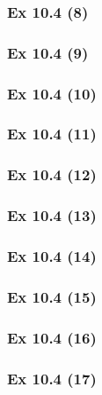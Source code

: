 \subsubsection{Ex 10.4 (8)}\label{sec:Ex_10.4.8}

\subsubsection{Ex 10.4 (9)}\label{sec:Ex_10.4.9}

\subsubsection{Ex 10.4 (10)}\label{sec:Ex_10.4.10}

\newpage		%

\subsubsection{Ex 10.4 (11)}\label{sec:Ex_10.4.11}

\subsubsection{Ex 10.4 (12)}\label{sec:Ex_10.4.12}

\subsubsection{Ex 10.4 (13)}\label{sec:Ex_10.4.13}

\subsubsection{Ex 10.4 (14)}\label{sec:Ex_10.4.14}

\subsubsection{Ex 10.4 (15)}\label{sec:Ex_10.4.15}

\subsubsection{Ex 10.4 (16)}\label{sec:Ex_10.4.16}

\subsubsection{Ex 10.4 (17)}\label{sec:Ex_10.4.17}

